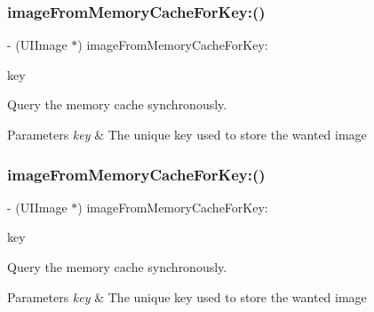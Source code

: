 \subsubsection{\texorpdfstring{image\+From\+Memory\+Cache\+For\+Key\+:()}{imageFromMemoryCacheForKey:()}\hspace{0.1cm}{\footnotesize\ttfamily [2/3]}}
{\footnotesize\ttfamily -\/ (U\+I\+Image $\ast$) image\+From\+Memory\+Cache\+For\+Key\+: \begin{DoxyParamCaption}\item[{(N\+S\+String $\ast$)}]{key }\end{DoxyParamCaption}}

Query the memory cache synchronously.


\begin{DoxyParams}{Parameters}
{\em key} & The unique key used to store the wanted image \\
\hline
\end{DoxyParams}
\mbox{\label{interface_s_d_image_cache_abe13b43b333bbb5bbe56142b8d573bd2}} 
\subsubsection{\texorpdfstring{image\+From\+Memory\+Cache\+For\+Key\+:()}{imageFromMemoryCacheForKey:()}\hspace{0.1cm}{\footnotesize\ttfamily [3/3]}}
{\footnotesize\ttfamily -\/ (U\+I\+Image $\ast$) image\+From\+Memory\+Cache\+For\+Key\+: \begin{DoxyParamCaption}\item[{(N\+S\+String $\ast$)}]{key }\end{DoxyParamCaption}}

Query the memory cache synchronously.


\begin{DoxyParams}{Parameters}
{\em key} & The unique key used to store the wanted image \\
\hline
\end{DoxyParams}
\mbox{\label{interface_s_d_image_cache_a586dcc0a4f8b68e5866b8d2c7bdce7db}} 
